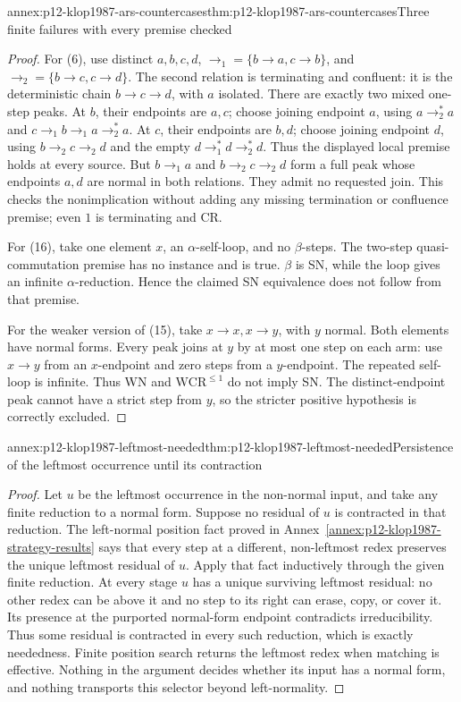 \begin{annexitem}{annex:p12-klop1987-ars-countercases}{thm:p12-klop1987-ars-countercases}{Three finite failures with every premise checked}
\begin{proof}
For (6), use distinct \(a,b,c,d\),
\(\to_1=\{b\to a,c\to b\}\), and
\(\to_2=\{b\to c,c\to d\}\).
The second relation is terminating and confluent: it is the deterministic
chain \(b\to c\to d\), with \(a\) isolated.
There are exactly two mixed one-step peaks. At \(b\), their
endpoints are \(a,c\); choose joining endpoint \(a\), using
\(a\to_2^*a\) and \(c\to_1b\to_1a\to_2^*a\).
At \(c\), their endpoints are \(b,d\); choose joining endpoint
\(d\), using \(b\to_2c\to_2d\) and the empty
\(d\to_1^*d\to_2^*d\). Thus the displayed local premise
holds at every source. But \(b\to_1a\) and
\(b\to_2c\to_2d\) form a full peak whose endpoints
\(a,d\) are normal in both relations. They admit no requested
join. This checks the nonimplication without adding any missing
termination or confluence premise; even \(1\) is terminating and CR.

For (16), take one element \(x\), an \(\alpha\)-self-loop,
and no \(\beta\)-steps. The two-step quasi-commutation premise
has no instance and is true. \(\beta\) is SN, while the loop
gives an infinite \(\alpha\)-reduction. Hence the claimed SN
equivalence does not follow from that premise.

For the weaker version of (15), take \(x\to x,x\to y\),
with \(y\) normal. Both elements have normal forms. Every peak
joins at \(y\) by at most one step on each arm: use \(x\to y\)
from an \(x\)-endpoint and zero steps from a \(y\)-endpoint.
The repeated self-loop is infinite. Thus WN and
\(\mathrm{WCR}^{\leq1}\) do not imply SN. The distinct-endpoint
peak cannot have a strict step from \(y\), so the stricter positive
hypothesis is correctly excluded.
\end{proof}
\end{annexitem}

\begin{annexitem}{annex:p12-klop1987-leftmost-needed}{thm:p12-klop1987-leftmost-needed}{Persistence of the leftmost occurrence until its contraction}
\begin{proof}
Let \(u\) be the leftmost occurrence in the non-normal input, and
take any finite reduction to a normal form. Suppose no residual of
\(u\) is contracted in that reduction. The left-normal position
fact proved in Annex~\ref{annex:p12-klop1987-strategy-results} says
that every step at a different, non-leftmost redex preserves the unique
leftmost residual of \(u\). Apply that fact inductively through the
given finite reduction. At every stage \(u\) has a unique surviving
leftmost residual: no other redex can be above it and no step to its
right can erase, copy, or cover it. Its presence at the purported
normal-form endpoint contradicts irreducibility. Thus some residual
is contracted in every such reduction, which is exactly neededness.
Finite position search returns the leftmost redex when matching is
effective. Nothing in the argument decides whether its input has a
normal form, and nothing transports this selector beyond left-normality.
\end{proof}
\end{annexitem}

